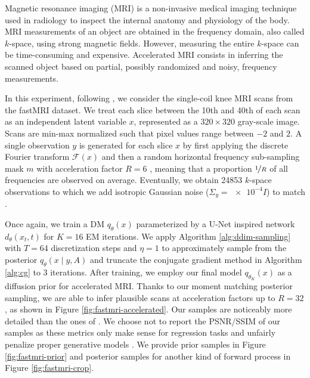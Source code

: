 Magnetic resonance imaging (MRI) is a non-invasive medical imaging technique used in radiology to inspect the internal anatomy and physiology of the body. MRI measurements of an object are obtained in the frequency domain, also called $k$-space, using strong magnetic fields. However, measuring the entire $k$-space can be time-consuming and expensive. Accelerated MRI \cite{wang2016accelerating, hammernik2018learning, han2020kspace, zbontar2018fastmri, knoll2020fastmri} consists in inferring the scanned object based on partial, possibly randomized and noisy, frequency measurements.

In this experiment, following \textcite{kawar2024gsurebased}, we consider the single-coil knee MRI scans from the fastMRI \cite{zbontar2018fastmri, knoll2020fastmri} dataset. We treat each slice between the 10th and 40th of each scan as an independent latent variable $x$, represented as a $320 \times 320$ gray-scale image. Scans are min-max normalized such that pixel values range between $-2$ and $2$. A single observation $y$ is generated for each slice $x$ by first applying the discrete Fourier transform $\mathcal{F}(x)$ and then a random horizontal frequency sub-sampling mask $m$ with acceleration factor $R = 6$ \cite{jalal2021robust, kawar2024gsurebased}, meaning that a proportion $\nicefrac{1}{R}$ of all frequencies are observed on average. Eventually, we obtain \num{24853} $k$-space observations to which we add isotropic Gaussian noise ($\Sigma_y = \num{e-4} I$) to match \textcite{kawar2024gsurebased}.

Once again, we train a DM $q_\theta(x)$ parameterized by a U-Net \cite{ronneberger2015unet} inspired network $d_\theta(x_t, t)$ for $K = 16$ EM iterations. We apply Algorithm \ref{alg:ddim-sampling} with $T = 64$ discretization steps and $\eta = 1$ to approximately sample from the posterior $q_\theta(x \mid y, A)$ and truncate the conjugate gradient method in Algorithm \ref{alg:cg} to 3 iterations. After training, we employ our final model $q_{\theta_K}(x)$ as a diffusion prior for accelerated MRI. Thanks to our moment matching posterior sampling, we are able to infer plausible scans at acceleration factors up to $R = 32$, as shown in Figure \ref{fig:fastmri-accelerated}. Our samples are noticeably more detailed than the ones of \textcite{kawar2024gsurebased}. We choose not to report the PSNR/SSIM of our samples as these metrics only make sense for regression tasks and unfairly penalize proper generative models \cite{blau2018perceptiondistortion, delbracio2023inversion}. We provide prior samples in Figure \ref{fig:fastmri-prior} and posterior samples for another kind of forward process in Figure \ref{fig:fastmri-crop}.


